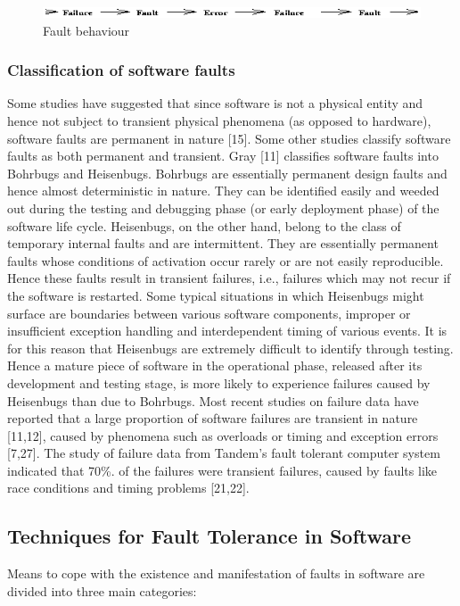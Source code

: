 \documentclass[a4paper, 11pt]{article}
\begin{document}
\begin{figure}[htbp]
	\centering
	\includegraphics[width=0.6\linewidth]{images/img1.png}
	\caption{Fault behaviour}
\end{figure}

\subsubsection{Classification of software faults}
Some studies have suggested that since software is not a physical entity and hence not subject to transient physical phenomena (as opposed to hardware), software faults are permanent in nature [15]. Some other studies classify software faults as both permanent and transient. Gray [11] classifies software faults into Bohrbugs and Heisenbugs. Bohrbugs are essentially permanent design faults and hence almost deterministic in nature. They can be identified easily and weeded out during the testing and debugging phase (or early deployment phase) of the software life cycle. Heisenbugs, on the other hand, belong to the class of temporary internal faults and are intermittent. They are essentially permanent faults whose conditions of activation occur rarely or are not easily reproducible. Hence these faults result in transient failures, i.e., failures which may not recur if the software is restarted. Some typical situations in which Heisenbugs might surface are boundaries between various software components, improper or insufficient exception handling and interdependent timing of various events. It is for this reason that Heisenbugs are extremely difficult to identify through testing. Hence a mature piece of software in the operational phase, released after its development and testing stage, is more likely to experience failures caused by Heisenbugs than due to Bohrbugs. Most recent studies on failure data have reported that a large proportion of software failures are transient in nature [11,12], caused by phenomena such as overloads or timing and exception errors [7,27]. The study of failure data from Tandem's fault tolerant computer system indicated that 70\%. of the failures were transient failures, caused by faults like race conditions and timing problems [21,22].

\subsection{Techniques for Fault Tolerance in Software}
Means to cope with the existence and manifestation of faults in software are divided into three main categories:
\end{document}
